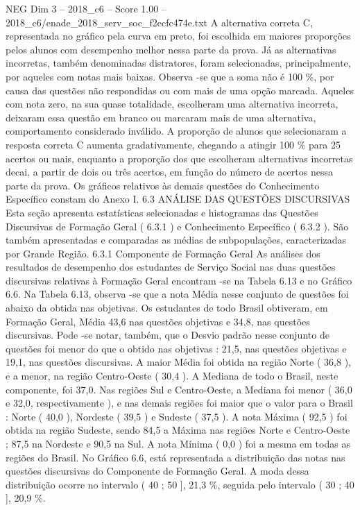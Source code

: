 \begin{textsample}{NEG Dim 3 – 2018\_c6 – Score 1.00 – 2018\_c6/enade\_2018\_serv\_soc\_f2ecfc474e.txt}
A alternativa correta C, representada no gráfico pela curva em preto, foi escolhida em maiores proporções pelos alunos com desempenho melhor nessa parte da prova.
Já as alternativas incorretas, também denominadas distratores, foram selecionadas, principalmente, por aqueles com notas mais baixas.
Observa -se que a soma não é 100 \%, por causa das questões não respondidas ou com mais de uma opção marcada.
Aqueles com nota zero, na sua quase totalidade, escolheram uma alternativa incorreta, deixaram essa questão em branco ou marcaram mais de uma alternativa, comportamento considerado inválido.
A proporção de alunos que selecionaram a resposta correta C aumenta gradativamente, chegando a atingir 100 \% para 25 acertos ou mais, enquanto a proporção dos que escolheram alternativas incorretas decai, a partir de dois ou três acertos, em função do número de acertos nessa parte da prova.
Os gráficos relativos às demais questões do Conhecimento Específico constam do Anexo I. 6.3 ANÁLISE DAS QUESTÕES DISCURSIVAS Esta seção apresenta estatísticas selecionadas e histogramas das Questões Discursivas de Formação Geral ( 6.3.1 ) e Conhecimento Específico ( 6.3.2 ).
São também apresentadas e comparadas as médias de subpopulações, caracterizadas por Grande Região. 6.3.1 Componente de Formação Geral As análises dos resultados de desempenho dos estudantes de Serviço Social nas duas questões discursivas relativas à Formação Geral encontram -se na Tabela 6.13 e no Gráfico 6.6.
Na Tabela 6.13, observa -se que a nota Média nesse conjunto de questões foi abaixo da obtida nas objetivas.
Os estudantes de todo Brasil obtiveram, em Formação Geral, Média 43,6 nas questões objetivas e 34,8, nas questões discursivas.
Pode -se notar, também, que o Desvio padrão nesse conjunto de questões foi menor do que o obtido nas objetivas : 21,5, nas questões objetivas e 19,1, nas questões discursivas.
A maior Média foi obtida na região Norte ( 36,8 ), e a menor, na região Centro-Oeste ( 30,4 ).
A Mediana de todo o Brasil, neste componente, foi 37,0.
Nas regiões Sul e Centro-Oeste, a Mediana foi menor ( 36,0 e 32,0, respectivamente ), e nas demais regiões foi maior que o valor para o Brasil : Norte ( 40,0 ), Nordeste ( 39,5 ) e Sudeste ( 37,5 ).
A nota Máxima ( 92,5 ) foi obtida na região Sudeste, sendo 84,5 a Máxima nas regiões Norte e Centro-Oeste ; 87,5 na Nordeste e 90,5 na Sul.
A nota Mínima ( 0,0 ) foi a mesma em todas as regiões do Brasil.
No Gráfico 6.6, está representada a distribuição das notas nas questões discursivas do Componente de Formação Geral.
A moda dessa distribuição ocorre no intervalo ( 40 ; 50 ], 21,3 \%, seguida pelo intervalo ( 30 ; 40 ], 20,9 \%.

\end{textsample}
